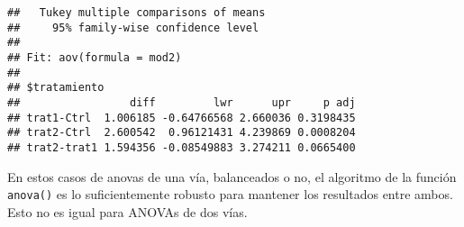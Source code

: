 \documentclass[
]{article}
\begin{document}
\begin{verbatim}
##   Tukey multiple comparisons of means
##     95% family-wise confidence level
## 
## Fit: aov(formula = mod2)
## 
## $tratamiento
##                 diff         lwr      upr     p adj
## trat1-Ctrl  1.006185 -0.64766568 2.660036 0.3198435
## trat2-Ctrl  2.600542  0.96121431 4.239869 0.0008204
## trat2-trat1 1.594356 -0.08549883 3.274211 0.0665400
\end{verbatim}

En estos casos de anovas de una vía, balanceados o no, el algoritmo de
la función \texttt{anova()} es lo suficientemente robusto para mantener
los resultados entre ambos. Esto no es igual para ANOVAs de dos vías.
\end{document}

